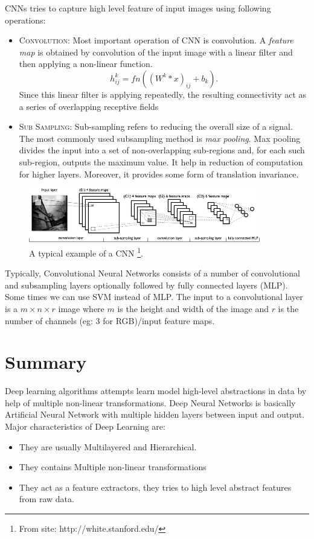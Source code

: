 \noindent CNNs tries to capture high level feature of input images using following operations:
\begin{itemize}
\item \textsc{Convolution}: Most important operation of CNN is convolution. A \textit{feature map} is obtained by convolution of the input image with a linear filter and then applying a non-linear function. 
$$h^k_{ij} = fn( (W^k * x)_{ij} + b_k ).$$
Since this linear filter is applying repeatedly, the resulting connectivity act as a series of overlapping receptive fields
\item \textsc{Sub Sampling}: Sub-sampling refers to reducing the overall size of a signal. The most commonly used subsampling method is \textit{max pooling}. Max pooling divides the input into a set of non-overlapping sub-regions and, for each such sub-region, outputs the maximum value. It help in reduction of computation for higher layers. Moreover, it provides some form of translation invariance. 
\end{itemize}

\begin{figure}[!ht]
\centering
\includegraphics[width=0.9\textwidth]{./imgs/cnn1.png} 
\caption[An example of a convolutional neural network]{A typical example of a CNN \footnote{From site: http://white.stanford.edu/}. }
\label{fig:cnn_layer}
\end{figure}


Typically, Convolutional Neural Networks consists of a number of convolutional and subsampling layers optionally followed by fully connected layers (MLP). Some times we can use SVM instead of MLP. The input to a convolutional layer is a $m \times n \times r$ image where $m$ is the height and width of the image and $r$ is the number of channels (eg: 3 for RGB)/input feature maps. 

\section{Summary}
Deep learning algorithms attempts learn model high-level abstractions in data by help of multiple non-linear transformations. Deep Neural Networks is basically Artificial Neural Network with multiple hidden layers between input and output. Major characteristics  of Deep Learning are:
\begin{itemize}
\item They are usually Multilayered and Hierarchical.
\item They contains Multiple non-linear transformations 
\item They act as a feature extractors, they tries to high level abstract features from raw data.
\end{itemize}

